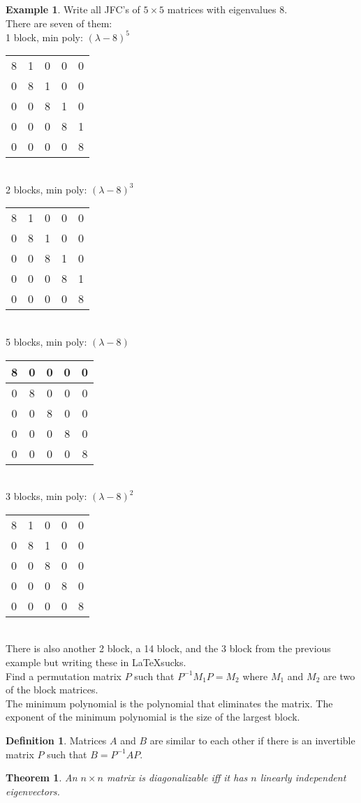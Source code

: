 \documentclass{report}
\theoremstyle{plain}
\newtheorem*{thrm}{Theorem}
\theoremstyle{definition}
\newtheorem*{ex}{Example}
\newtheorem*{defn}{Definition}
\theoremstyle{plain}
\begin{document}
\begin{ex}
Write all JFC's of $5\times 5$ matrices with eigenvalues 8.\\
There are seven of them:\\
1 block, min poly: $(\lambda-8)^5$
\begin{tabular}{ccccc}
8&1&0&0&0\\
0&8&1&0&0\\
0&0&8&1&0\\
0&0&0&8&1\\
0&0&0&0&8\\
\end{tabular}\\
2 blocks, min poly: $(\lambda-8)^3$
\begin{tabular}{cccc|c}
8&1&0&0&0\\
0&8&1&0&0\\
0&0&8&1&0\\
\hline
0&0&0&8&1\\
0&0&0&0&8\\
\end{tabular}\\
5 blocks, min poly: $(\lambda-8)$
\begin{tabular}{c|c|c|c|c}
8&0&0&0&0\\
\hline
0&8&0&0&0\\
\hline
0&0&8&0&0\\
\hline
0&0&0&8&0\\
\hline
0&0&0&0&8\\
\end{tabular}\\
3 blocks, min poly: $(\lambda-8)^2$
\begin{tabular}{ccc|c|c}
8&1&0&0&0\\
0&8&1&0&0\\
0&0&8&0&0\\
\hline
0&0&0&8&0\\
\hline
0&0&0&0&8\\
\end{tabular}\\
There is also another 2 block, a 14 block, and the 3 block from the previous example but writing these in \LaTeX sucks.\\
Find a permutation matrix $P$ such that $P^{-1}M_1P=M_2$ where $M_1$ and $M_2$ are two of the block matrices.\\
The minimum polynomial is the polynomial that eliminates the matrix. The exponent of the minimum polynomial is the size of the largest block.\\
\end{ex}
\begin{defn}
Matrices $A$ and $B$ are similar to each other if there is an invertible matrix $P$ such that $B=P^{-1}AP$.
\end{defn}
\begin{thrm}
An $n\times n$ matrix is diagonalizable iff it has $n$ linearly independent eigenvectors.
\end{thrm}
\end{document}
